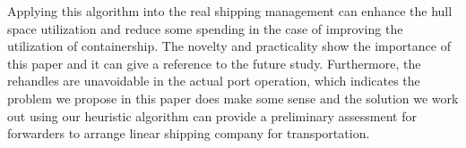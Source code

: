 \documentclass[review,3p,times,authoryear,12pt]{elsarticle}
\begin{document}
Applying this algorithm into the real shipping management can enhance the hull space utilization and reduce some spending in the case of
improving the utilization of containership.
The novelty and practicality show the importance of this paper and it can give a reference to the future study.
Furthermore, the rehandles are unavoidable in the actual port operation, which indicates the problem we propose in this paper
does make some sense and the solution we work out using our heuristic algorithm can provide a preliminary assessment for forwarders to
arrange linear shipping company for transportation.



\end{document}
